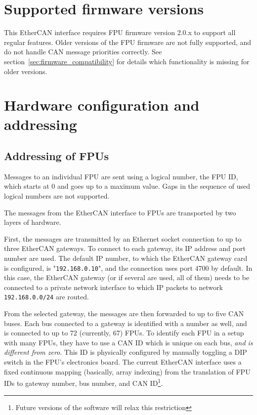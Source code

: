 \documentclass[fontsize=12,a4paper]{scrreprt}
\begin{document}
\section{Supported firmware versions}
This EtherCAN interface requires FPU firmware version 2.0.x to support
all regular features. Older versions of the FPU firmware are not fully
supported, and do not handle CAN message priorities correctly.  See
section~\ref{sec:firmware_compatibility} for details which
functionality is missing for older versions.

\section{Hardware configuration and addressing}
\subsection{Addressing of FPUs}
\label{sec:hardwareaddressing}
Messages to an individual FPU are sent using a logical number, the FPU
ID, which starts at 0 and goes up to a maximum value. Gaps in the
sequence of used logical numbers are not supported.

The messages from the EtherCAN interface to FPUs are transported by two layers of
hardware.

   First, the
messages are transmitted by an Ethernet socket connection to up to
three EtherCAN gateways. To connect to each gateway, its IP address
and port number are used. The default IP number, to which the EtherCAN
gateway card is configured, is "\texttt{192.168.0.10}", and the
connection uses port 4700 by default. In this case, the EtherCAN
gateway (or if several are used, all of them) needs to be connected to
a private network interface to which IP packets to network
\texttt{192.168.0.0/24} are routed.

From the selected gateway, the messages are then forwarded to up to
five CAN buses. Each bus connected to a gateway is identified with a
number as well, and is connected to up to 72 (currently, 67) FPUs.
 To identify each FPU in a setup with many FPUs,
they have to use a CAN ID which is unique on each bus, \emph{and is
  different from zero}. This ID is physically configured by manually
toggling a DIP switch in the FPU's electronics board. The current
EtherCAN interface uses a fixed continuous mapping (basically, array
indexing) from the translation of FPU IDs to gateway number, bus
number, and CAN ID\footnote{Future versions of the software will relax
  this restriction}.
\end{document}
